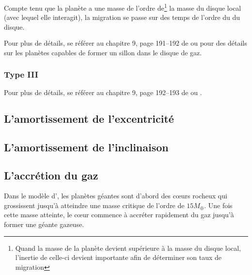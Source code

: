 Compte tenu que la planète a une masse de l'ordre de\footnote{Quand la masse de la planète devient supérieure à la masse du disque local, l'inertie de celle-ci devient importante afin de déterminer son taux de migration} la masse du disque local (avec lequel elle interagit), la migration se passe sur des temps de l'ordre du  du disque.

\begin{remarque}
Pour plus de détails, se référer au chapitre 9, page 191--192 de \cite{barnes2010formation} ou \cite{lin1986tidal} pour des détails sur les planètes capables de former un sillon dans le disque de gaz.
\end{remarque}
\subsubsection{Type III}


\begin{remarque}
Pour plus de détails, se référer au chapitre 9, page 192--193 de \cite{barnes2010formation} ou \cite{masset2003runaway}.
\end{remarque}

\subsection{L'amortissement de l'excentricité}%

\subsection{L'amortissement de l'inclinaison}%

\subsection{L'accrétion du gaz}\label{sec:accretion_coeur}
Dans le modèle d', les planètes géantes sont d'abord des c\oe urs rocheux qui grossissent jusqu'à atteindre une masse critique de l'ordre de $15 M_{\oplus}$. Une fois cette masse atteinte, le c\oe ur commence à accréter rapidement du gaz jusqu'à former une géante gazeuse.

